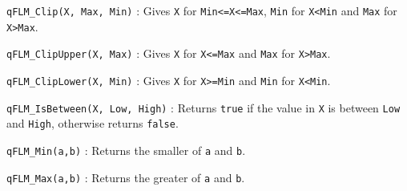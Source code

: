 \documentclass{article}
\begin{document}
\lstinline{qFLM_Clip(X, Max, Min)} :  Gives \lstinline{X} for \lstinline{Min<=X<=Max}, \lstinline{Min} for \lstinline{X<Min} and \lstinline{Max} for \lstinline{X>Max}.

\noindent\hrulefill

\lstinline{qFLM_ClipUpper(X, Max)} : Gives \lstinline{X} for \lstinline{X<=Max} and \lstinline{Max} for \lstinline{X>Max}.

\noindent\hrulefill

\lstinline{qFLM_ClipLower(X, Min)} : Gives \lstinline{X} for \lstinline{X>=Min} and \lstinline{Min} for \lstinline{X<Min}.

\noindent\hrulefill

\lstinline{qFLM_IsBetween(X, Low, High)} : Returns \lstinline{true} if the value in \lstinline{X} is between \lstinline{Low} and \lstinline{High}, otherwise returns \lstinline{false}.

\noindent\hrulefill

\lstinline{qFLM_Min(a,b)} : Returns the smaller of \lstinline{a} and \lstinline{b}.

\noindent\hrulefill

\lstinline{qFLM_Max(a,b)} :  Returns the greater of \lstinline{a} and \lstinline{b}.

\newpage




\printindex
\end{document}
